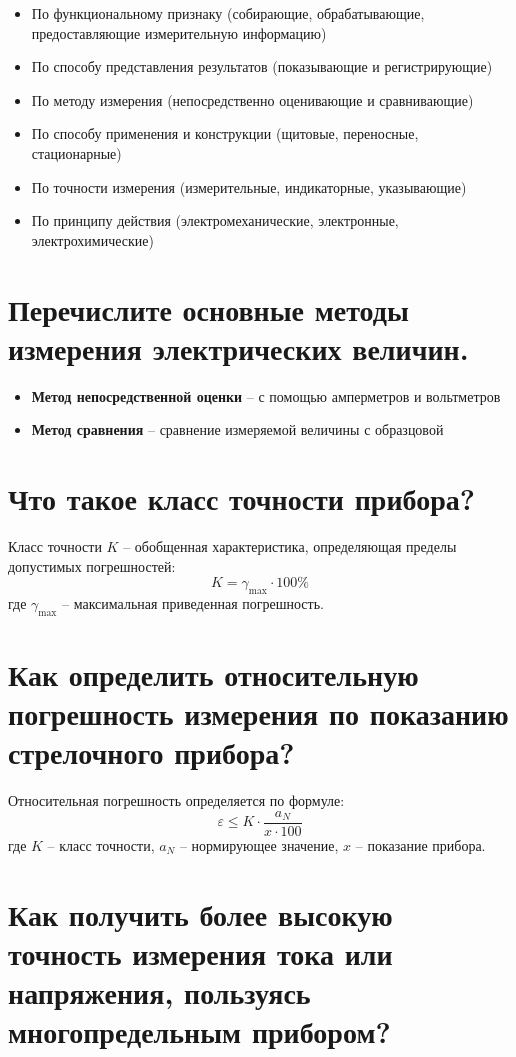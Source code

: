 \documentclass[14pt, a4paper, twoside]{extreport}
\begin{document}
\begin{itemize}
  \item По функциональному признаку (собирающие, обрабатывающие, предоставляющие измерительную информацию)
  \item По способу представления результатов (показывающие и регистрирующие)
  \item По методу измерения (непосредственно оценивающие и сравнивающие)
  \item По способу применения и конструкции (щитовые, переносные, стационарные)
  \item По точности измерения (измерительные, индикаторные, указывающие)
  \item По принципу действия (электромеханические, электронные, электрохимические)
\end{itemize}

\section{Перечислите основные методы измерения электрических величин.}

\begin{itemize}
  \item \textbf{Метод непосредственной оценки} -- с помощью амперметров и вольтметров
  \item \textbf{Метод сравнения} -- сравнение измеряемой величины с образцовой
\end{itemize}

\section{Что такое класс точности прибора?}

Класс точности $K$ -- обобщенная характеристика, определяющая пределы допустимых погрешностей:
\[
  K = \gamma_{\text{max}} \cdot 100\%
\]
где $\gamma_{\text{max}}$ -- максимальная приведенная погрешность.

\section{Как определить относительную погрешность измерения по показанию стрелочного прибора?}

Относительная погрешность определяется по формуле:
\[
  \varepsilon \leq K \cdot \frac{a_N}{x \cdot 100}
\]
где $K$ -- класс точности, $a_N$ -- нормирующее значение, $x$ -- показание прибора.

\section{Как получить более высокую точность измерения тока или напряжения, пользуясь многопредельным прибором?}
\end{document}

